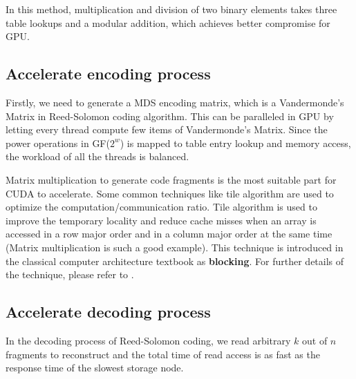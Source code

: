 \documentclass[a4paper]{article}
\begin{document}
In this method, multiplication and division of two binary elements takes three table lookups and a modular addition,
which achieves better compromise for GPU.

\subsection{Accelerate encoding process}

Firstly, we need to generate a MDS encoding matrix,
which is a Vandermonde's Matrix in Reed-Solomon coding algorithm.
%
This can be paralleled in GPU by letting every thread compute few items of Vandermonde's Matrix.
Since the power operations in GF($2^w$) is mapped to
table entry lookup and memory access,
the workload of all the threads is balanced.

Matrix multiplication to generate code fragments is the most suitable part for CUDA to accelerate.
Some common techniques like tile algorithm are used to optimize the computation/communication ratio.
Tile algorithm is used to improve the temporary locality and reduce cache misses when an array is accessed in a row major order and in a column major order at the same time (Matrix multiplication is such a good example). This technique is introduced in the classical computer architecture textbook \cite{hennessy2012computer} as \textbf{blocking}. For further details of the technique, please refer to \cite{nvidia2010cuda}.

\subsection{Accelerate decoding process}

In the decoding process of Reed-Solomon coding, 
we read arbitrary $k$ out of $n$ fragments to reconstruct and the total time of read access is as fast as the response time of the slowest storage node.

\end{document}
